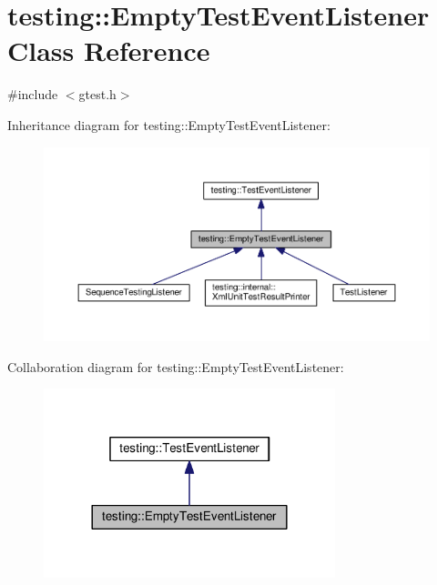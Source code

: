 \hypertarget{classtesting_1_1EmptyTestEventListener}{}\section{testing\+:\+:Empty\+Test\+Event\+Listener Class Reference}
\label{classtesting_1_1EmptyTestEventListener}


{\ttfamily \#include $<$gtest.\+h$>$}



Inheritance diagram for testing\+:\+:Empty\+Test\+Event\+Listener\+:
\nopagebreak
\begin{figure}[H]
\begin{center}
\leavevmode
\includegraphics[width=350pt]{classtesting_1_1EmptyTestEventListener__inherit__graph}
\end{center}
\end{figure}


Collaboration diagram for testing\+:\+:Empty\+Test\+Event\+Listener\+:
\nopagebreak
\begin{figure}[H]
\begin{center}
\leavevmode
\includegraphics[width=240pt]{classtesting_1_1EmptyTestEventListener__coll__graph}
\end{center}
\end{figure}
